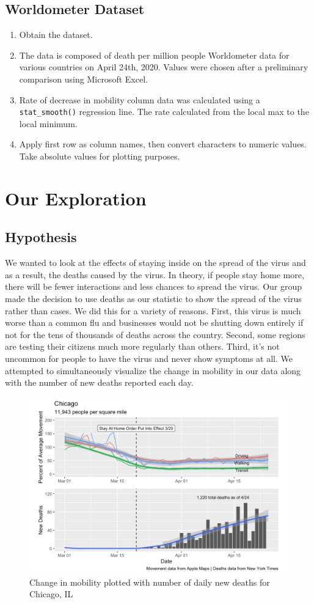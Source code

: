 \documentclass[11pt, english]{article}
\begin{document}
\subsection{Worldometer Dataset}
\begin{enumerate}
    \item Obtain the dataset.
    \item The data is composed of death per million people Worldometer data for various countries on April 24th, 2020. Values were chosen after a preliminary comparison using Microsoft Excel. 
    \item Rate of decrease in mobility column data was calculated using a \texttt{stat\_smooth()} regression line. The rate calculated from the local max to the local minimum. 
    \item Apply first row as column names, then convert characters to numeric values. 
Take absolute values for plotting purposes.

\end{enumerate}{}\newpage
\section{Our Exploration}
\subsection{Hypothesis}
We wanted to look at the effects of staying inside on the spread of the virus and as a result, the deaths caused by the virus. In theory, if people stay home more, there will be fewer interactions and less chances to spread the virus. Our group made the decision to use deaths as our statistic to show the spread of the virus rather than cases. We did this for a variety of reasons. First, this virus is much worse than a common flu and businesses would not be shutting down entirely if not for the tens of thousands of deaths across the country. Second, some regions are testing their citizens much more regularly than others. Third, it’s not uncommon for people to have the virus and never show symptoms at all. We attempted to simultaneously visualize the change in mobility in our data along with the number of new deaths reported each day.
\begin{figure}[h!]
  \includegraphics[width=\linewidth]{image6.png}
  \caption{Change in mobility plotted with number of daily new deaths for Chicago, IL}
  \label{fig:chicago}
\end{figure}
\end{document}
